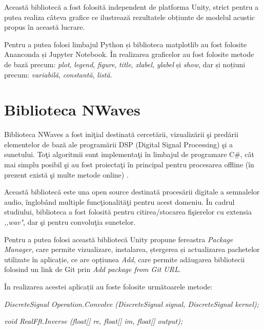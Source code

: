 	Această bibliotecă a fost folosită independent de platforma Unity, strict pentru a putea realiza câteva grafice ce ilustrează rezultatele obțiunte de modelul acustic propus în această lucrare.
	
	Pentru a putea folosi limbajul Python și biblioteca matplotlib au fost folosite Ananconda și Jupyter Notebook. În realizarea graficelor au fost folosite metode de bază precum: \textit{plot}, \textit{legend}, \textit{figure}, \textit{title}, \textit{xlabel}, \textit{ylabel} și \textit{show}, dar și noțiuni precum: \textit{variabilă}, \textit{constantă}, \textit{listă}.

\section{Biblioteca NWaves}
	Biblioteca NWaves a fost ini\c{t}ial destinat\u{a} cercet\u{a}rii, vizualiz\u{a}rii \c{s}i pred\u{a}rii elementelor de baz\u{a} ale program\u{a}rii DSP (Digital Signal Processing) \c{s}i a sunetului. To\c{t}i algoritmii sunt implementa\c{t}i \^{i}n limbajul de programare C{\#}, c\^{a}t mai simplu posibil \c{s}i au fost proiecta\c{t}i \^{i}n principal pentru procesarea offline (\^{i}n prezent exist\u{a} \c{s}i multe metode online) \cite{nwaves}.
	
	Aceast\u{a} bibliotec\u{a} este una open source destinat\u{a} proces\u{a}rii digitale a semnalelor audio, \^{i}nglob\^{a}nd multiple func\c{t}ionalit\u{a}\c{t}i pentru acest domeniu. \^{I}n cadrul studiului, biblioteca a fost folosit\u{a} pentru citirea/stocarea fi\c{s}ierelor cu extensia \textit{,,wav"}, dar \c{s}i pentru convolu\c{t}ia sunetelor.
	
	Pentru a putea folosi această bibliotecă Unity propune fereastra \textit{Package Manager}, care permite vizualizare, instalarea, ștergerea și actualizarea pachetelor utilizate în aplicație, ce are opțiunea \textit{Add}, care permite adăugarea bibliotecii folosind un link de Git prin \textit{Add package from Git URL}. 
	
	În realizarea acestei aplicații au foste folosite următoarele metode:
	
	\begin{itemize}
		\utb \textit{DiscreteSignal Operation.Convolve (DiscreteSignal signal, DiscreteSignal kernel);}
	
		\utb \textit{void RealFft.Inverse (float[] re, float[] im, float[] output);}
	
	\end{itemize}
	
